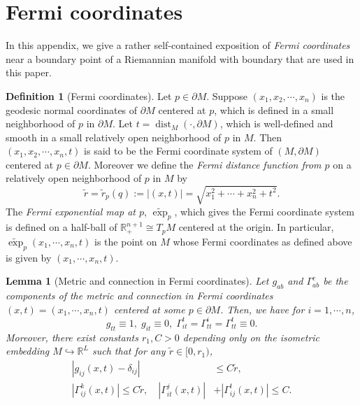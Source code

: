 \documentclass[10pt]{amsart}
\newtheorem{lemma}[theorem]{Lemma}
\theoremstyle{definition}
\newtheorem{definition}[theorem]{Definition}
\theoremstyle{remark}
\numberwithin{equation}{section}
\newcommand{\R}{\mathbb{R}}
\newcommand{\de}{\delta}
\newcommand{\tE}{\widetilde{\exp}}
\newcommand{\tir}{\widetilde{r}}
\newcommand{\dist}{\operatorname{dist}}
\begin{document}
\appendix


\section{Fermi coordinates}
\label{A:Fermi}

In this appendix, we give a rather self-contained exposition of \emph{Fermi coordinates} near a boundary point of a Riemannian manifold with boundary that are used in this paper.


\begin{definition}[Fermi coordinates]
\label{D:Fermi}
Let $p \in \partial M$. Suppose $(x_1,x_2,\cdots,x_n)$ is the geodesic normal coordinates of $\partial M$ centered at $p$, which is defined in a small neighborhood of $p$ in $\partial M$. Let $t=\dist_M(\cdot,\partial M)$, which is well-defined and smooth in a small relatively open neighborhood of $p$ in $M$. Then $(x_1,x_2,\cdots,x_n,t)$ is said to be the Fermi coordinate system of $(M,\partial M)$ centered at $p \in \partial M$. Moreover we define the \emph{Fermi distance function from $p$} on a relatively open neighborhood of $p$ in $M$ by
\begin{equation}
\label{E:rtilde}
\tir=\tir_p(q):=|(x,t)|=\sqrt{x_1^2+\cdots+x_n^2+t^2}.
\end{equation}
The \emph{Fermi exponential map at $p$}, $\tE_p$, which gives the Fermi coordinate system is defined on a half-ball of $\R^{n+1}_+ \cong T_pM$ centered at the origin. In particular, $\tE_p(x_1,\cdots,x_n,t)$ is the point on $M$ whose Fermi coordinates as defined above is given by $(x_1,\cdots,x_n,t)$.
\end{definition}


\begin{lemma}[Metric and connection in Fermi coordinates]
\label{L:Fermi}
Let $g_{ab}$ and $\Gamma_{ab}^c$ be the components of the metric and connection in Fermi coordinates $(x,t)=(x_1,\cdots,x_n,t)$ centered at some $p \in \partial M$. Then, we have for $i=1,\cdots,n$,
\begin{equation}
\label{E:g-Gamma} 
g_{tt} \equiv 1, \; g_{it} \equiv 0, \; \Gamma_{it}^t=\Gamma_{tt}^i=\Gamma_{tt}^t \equiv 0.
\end{equation}
Moreover, there exist constants $r_1,C>0$ depending only on the isometric embedding $M \hookrightarrow \mathbb{R}^L$ such that for any $\tir \in [0,r_1)$,
\begin{displaymath}
\begin{split}
 |g_{ij}(x,t)-\de_{ij}| & \leq C \tir, \\
|\Gamma_{ij}^k(x,t)| \leq C \tir,  \quad | \Gamma_{it}^j (x,t)| &+|\Gamma_{ij}^t(x,t)| \leq C.
\end{split}
\end{displaymath}
\end{lemma}
\end{document}
